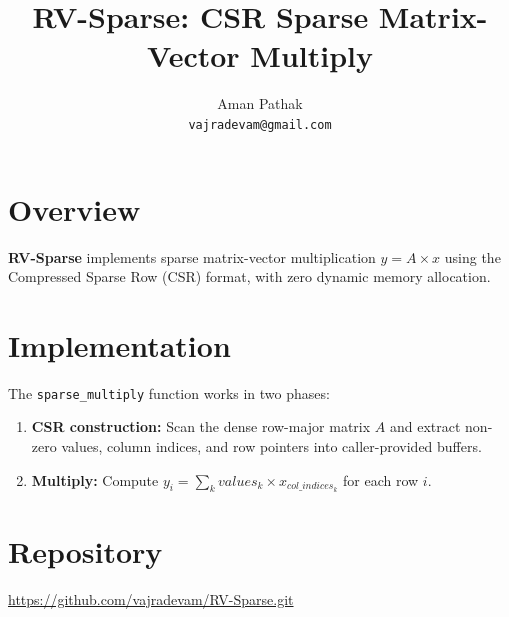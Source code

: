 \documentclass[a4paper,11pt]{article}
\title{RV-Sparse: CSR Sparse Matrix-Vector Multiply}
\author{Aman Pathak\\\texttt{vajradevam@gmail.com}}
\date{}
\begin{document}
\maketitle

\section{Overview}

\textbf{RV-Sparse} implements sparse matrix-vector multiplication
\(y = A \times x\) using the Compressed Sparse Row (CSR) format,
with zero dynamic memory allocation.

\section{Implementation}

The \texttt{sparse\_multiply} function works in two phases:

\begin{enumerate}
    \item \textbf{CSR construction:} Scan the dense row-major matrix
          \(A\) and extract non-zero values, column indices, and row
          pointers into caller-provided buffers.
    \item \textbf{Multiply:} Compute \(y_i = \sum_{k} values_k
          \times x_{col\_indices_k}\) for each row \(i\).
\end{enumerate}

\section{Repository}

\url{https://github.com/vajradevam/RV-Sparse.git}
\end{document}
